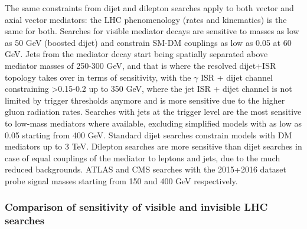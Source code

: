 The same constraints from dijet and dilepton searches apply to both vector and axial vector mediators:
the LHC phenomenology (rates and kinematics) is the same for both. Searches for visible mediator decays 
are sensitive to masses as low as 50 GeV (boosted dijet) and constrain SM-DM couplings \gq as low as 
0.05 at 60 GeV. Jets from the mediator decay start being spatially separated above mediator masses of 250-300 GeV, 
and that is where the resolved dijet+ISR topology takes over in terms of sensitivity, with the $\gamma$ ISR + dijet channel
constraining \gq>0.15-0.2 up to 350 GeV, where the jet ISR + dijet channel is not limited by
trigger thresholds anymore and is more sensitive due to the higher gluon radiation rates.
Searches with jets at the trigger level are the most sensitive to low-mass mediators where available,
excluding simplified models with \gq as low as 0.05 starting from 400 GeV. 
Standard dijet searches constrain models with DM mediators up to 3 TeV.  
Dilepton searches are more sensitive than dijet searches in case of equal couplings
of the mediator to leptons and jets, due to the much reduced backgrounds. ATLAS and CMS searches
with the 2015+2016 dataset probe signal masses starting from 150 and 400 GeV respectively.  


\subsubsection{Comparison of sensitivity of visible and invisible LHC searches}
\label{sub:comparisonVisibleInvisible}

